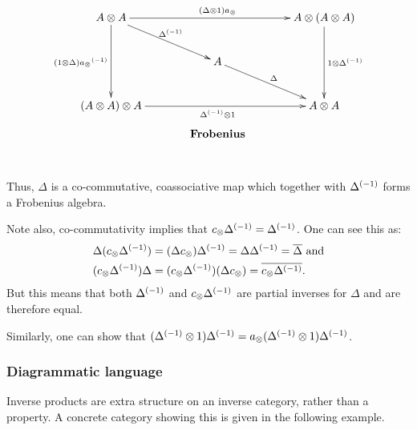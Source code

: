 \[
  \xymatrix @C=40pt @R=25pt{
    A \* A \ar[dd]_{(1\*\Delta) \inv{a_{\*}}} \ar[dr]^{\inv{\Delta}}
    \ar[rr]^{(\Delta \* 1) a_{\*}} & &
    A \* (A \* A) \ar[dd]^{1 \* \inv{\Delta}}\\
    & A \ar[dr]^{\Delta} & \\
    (A \* A) \* A \ar[rr]_{\inv{\Delta} \* 1} & &
    A \* A\\
    &*!<0pc,-25pt>{\text{\textbf{Frobenius}}}
  }
\]

Thus, $\Delta$ is a co-commutative, coassociative map which together with ${\Delta}^{(-1)}$ forms a
Frobenius algebra.
\begin{remark}
  Note also, co-commutativity implies that $c_{\otimes}{\Delta}^{(-1)} = {\Delta}^{(-1)}$.
  One can see this as:
  \begin{align*}
    \Delta(c_{\otimes}{\Delta}^{(-1)})
      &= (\Delta c_{\otimes}){\Delta}^{(-1)} = \Delta{\Delta}^{(-1)} = \overline{\Delta} \text{ and}\\
    (c_{\otimes}{\Delta}^{(-1)})\Delta
      & = (c_{\otimes}{\Delta}^{(-1)})(\Delta c_{\otimes}) = \overline{c_{\otimes}{\Delta}^{(-1)}}.
  \end{align*}
  But this means that both ${\Delta}^{(-1)}$ and $c_{\otimes}{\Delta}^{(-1)}$ are partial inverses for $\Delta$
  and are therefore equal.

  Similarly, one can show that $({\Delta}^{(-1)}\otimes 1){\Delta}^{(-1)} =
  a_{\otimes}({\Delta}^{(-1)}\otimes 1){\Delta}^{(-1)}$.
\end{remark}
\subsubsection{Diagrammatic language} %
\label{ssub:diagrammatic_language}



Inverse products are extra structure on an inverse category, rather than a property. A concrete
category showing this is given in the following example.

